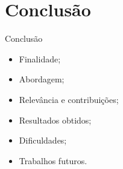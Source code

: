 \section{Conclusão}

\begin{frame}{Conclusão}
    \begin{itemize}
        \item Finalidade; \vspace{0.5cm}
        \item Abordagem; \vspace{0.5cm}
        \item Relevância e contribuições; \vspace{0.5cm}
        \item Resultados obtidos; \vspace{0.5cm}
        \item Dificuldades; \vspace{0.5cm}
        \item Trabalhos futuros. \vspace{0.5cm}
    \end{itemize}
\end{frame}